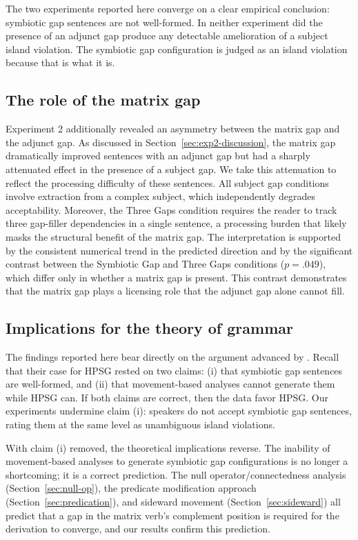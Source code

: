 \documentclass[12pt]{article}
\begin{document}
The two experiments reported here converge on a clear empirical conclusion: symbiotic gap sentences are not well-formed. In neither experiment did the presence of an adjunct gap produce any detectable amelioration of a subject island violation. The symbiotic gap configuration is judged as an island violation because that is what it is.

\subsection{The role of the matrix gap}\label{sec:matrix-gap-role}

Experiment 2 additionally revealed an asymmetry between the matrix gap and the adjunct gap. As discussed in Section~\ref{sec:exp2-discussion}, the matrix gap dramatically improved sentences with an adjunct gap but had a sharply attenuated effect in the presence of a subject gap. We take this attenuation to reflect the processing difficulty of these sentences. All subject gap conditions involve extraction from a complex subject, which independently degrades acceptability. Moreover, the Three Gaps condition requires the reader to track three gap-filler dependencies in a single sentence, a processing burden that likely masks the structural benefit of the matrix gap. The interpretation is supported by the consistent numerical trend in the predicted direction and by the significant contrast between the Symbiotic Gap and Three Gaps conditions ($p = .049$), which differ only in whether a matrix gap is present. This contrast demonstrates that the matrix gap plays a licensing role that the adjunct gap alone cannot fill.

\subsection{Implications for the theory of grammar}\label{sec:implications}

The findings reported here bear directly on the argument advanced by \citet{levine2003}. Recall that their case for HPSG rested on two claims: (i) that symbiotic gap sentences are well-formed, and (ii) that movement-based analyses cannot generate them while HPSG can. If both claims are correct, then the data favor HPSG. Our experiments undermine claim (i): speakers do not accept symbiotic gap sentences, rating them at the same level as unambiguous island violations.

With claim (i) removed, the theoretical implications reverse. The inability of movement-based analyses to generate symbiotic gap configurations is no longer a shortcoming; it is a correct prediction. The null operator/connectedness analysis (Section~\ref{sec:null-op}), the predicate modification approach (Section~\ref{sec:predication}), and sideward movement (Section~\ref{sec:sideward}) all predict that a gap in the matrix verb's complement position is required for the derivation to converge, and our results confirm this prediction.
\end{document}
